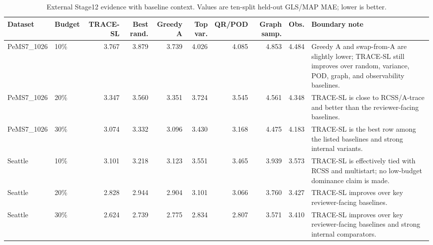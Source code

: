 \begin{table}[pos=htbp]
\centering
\caption{External Stage12 evidence with baseline context. Values are ten-split held-out GLS/MAP MAE; lower is better.}
\label{tab:external}
\scriptsize
\setlength{\tabcolsep}{3pt}
\begin{tabular}{llrrrrrrr>{\raggedright\arraybackslash}p{}}
\toprule
Dataset & Budget & TRACE-SL & Best rand. & Greedy A & Top var. & QR/POD & Graph samp. & Obs. & Boundary note \\
\midrule
PeMS7\_1026 & 10\% & 3.767 & 3.879 & 3.739 & 4.026 & 4.085 & 4.853 & 4.484 & Greedy A and swap-from-A are slightly lower; TRACE-SL still improves over random, variance, POD, graph, and observability baselines. \\
PeMS7\_1026 & 20\% & 3.347 & 3.560 & 3.351 & 3.724 & 3.545 & 4.561 & 4.348 & TRACE-SL is close to RCSS/A-trace and better than the reviewer-facing baselines. \\
PeMS7\_1026 & 30\% & 3.074 & 3.332 & 3.096 & 3.430 & 3.168 & 4.475 & 4.183 & TRACE-SL is the best row among the listed baselines and strong internal variants. \\
Seattle & 10\% & 3.101 & 3.218 & 3.123 & 3.551 & 3.465 & 3.939 & 3.573 & TRACE-SL is effectively tied with RCSS and multistart; no low-budget dominance claim is made. \\
Seattle & 20\% & 2.828 & 2.944 & 2.904 & 3.101 & 3.066 & 3.760 & 3.427 & TRACE-SL improves over key reviewer-facing baselines. \\
Seattle & 30\% & 2.624 & 2.739 & 2.775 & 2.834 & 2.807 & 3.571 & 3.410 & TRACE-SL improves over key reviewer-facing baselines and strong internal comparators. \\
\bottomrule
\end{tabular}
\end{table}
